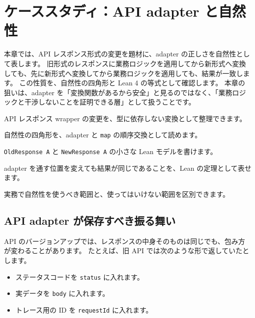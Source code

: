 \chapter{ケーススタディ：API adapter と自然性}
\label{chap:ch31-api-adapter-naturality}

\begin{chapterabstract}
本章では、API レスポンス形式の変更を題材に、adapter の正しさを自然性として表します。
旧形式のレスポンスに業務ロジックを適用してから新形式へ変換しても、先に新形式へ変換してから業務ロジックを適用しても、結果が一致します。
この性質を、自然性の四角形と Lean 4 の等式として確認します。
本章の狙いは、adapter を「変換関数があるから安全」と見るのではなく、「業務ロジックと干渉しないことを証明できる層」として扱うことです。
\end{chapterabstract}

\begin{learninggoals}
\item API レスポンス wrapper の変更を、型に依存しない変換として整理できます。
\item 自然性の四角形を、adapter と \texttt{map} の順序交換として読めます。
\item \texttt{OldResponse A} と \texttt{NewResponse A} の小さな Lean モデルを書けます。
\item adapter を通す位置を変えても結果が同じであることを、Lean の定理として表せます。
\item 実務で自然性を使うべき範囲と、使ってはいけない範囲を区別できます。
\end{learninggoals}

\section{API adapter が保存すべき振る舞い}

API のバージョンアップでは、レスポンスの中身そのものは同じでも、包み方が変わることがあります。
たとえば、旧 API では次のような形で返していたとします。

\begin{itemize}
\item ステータスコードを \texttt{status} に入れます。
\item 実データを \texttt{body} に入れます。
\item トレース用の ID を \texttt{requestId} に入れます。
\end{itemize}

